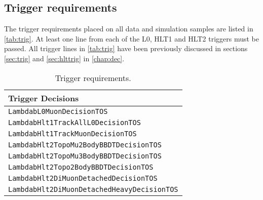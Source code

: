 





  \subsection{Trigger requirements}\label{Sec:Trigger}
 The trigger requirements placed on all data and simulation samples are listed in \autoref{tab:trig}. At least one line from each of the L0, HLT1 and HLT2 triggers must be passed. All trigger lines in \autoref{tab:trig} have been previously discussed in sections \ref{sec:trig} and \ref{sec:hlttrig} in \autoref{chap:dec}.
\begin{table}[h!]
  \label{tab:trig}
  \centering
  \begin{tabular}{ l }
    
    \hline
    Trigger Decisions\\
    \hline
    \tt LambdabL0MuonDecisionTOS \\
   \hline
   \tt LambdabHlt1TrackAllL0DecisionTOS \\
   \tt LambdabHlt1TrackMuonDecisionTOS\\
   \hline
   \tt LambdabHlt2TopoMu2BodyBBDTDecisionTOS     \\
   \tt LambdabHlt2TopoMu3BodyBBDTDecisionTOS     \\
   \tt LambdabHlt2Topo2BodyBBDTDecisionTOS       \\
   \tt LambdabHlt2DiMuonDetachedDecisionTOS      \\
   \tt LambdabHlt2DiMuonDetachedHeavyDecisionTOS\\
   \hline
  \end{tabular}
  
  \caption{Trigger requirements.}
          \label{tab:trig}  
    \end{table}

